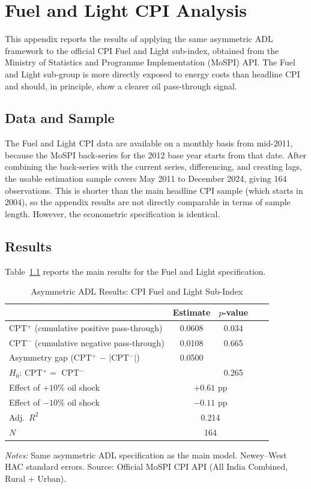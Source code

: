 \chapter{Fuel and Light CPI Analysis}
\label{ch:appendixA}

This appendix reports the results of applying the same asymmetric ADL framework to the official CPI Fuel and Light sub-index, obtained from the Ministry of Statistics and Programme Implementation (MoSPI) API. The Fuel and Light sub-group is more directly exposed to energy costs than headline CPI and should, in principle, show a clearer oil pass-through signal.

\section{Data and Sample}

The Fuel and Light CPI data are available on a monthly basis from mid-2011, because the MoSPI back-series for the 2012 base year starts from that date. After combining the back-series with the current series, differencing, and creating lags, the usable estimation sample covers May 2011 to December 2024, giving 164 observations. This is shorter than the main headline CPI sample (which starts in 2004), so the appendix results are not directly comparable in terms of sample length. However, the econometric specification is identical.

\section{Results}

Table~\ref{tab:fuel_light} reports the main results for the Fuel and Light specification.

\begin{table}[H]
\centering
\caption{Asymmetric ADL Results: CPI Fuel and Light Sub-Index}
\label{tab:fuel_light}
\begin{tabular}{lcccc}
\toprule
& \textbf{Estimate} & \textbf{$p$-value} \\
\midrule
CPT$^+$ (cumulative positive pass-through) & 0.0608 & 0.034 \\
CPT$^-$ (cumulative negative pass-through) & 0.0108 & 0.665 \\
Asymmetry gap (CPT$^+$ $-$ $|$CPT$^-|$) & 0.0500 & \\
$H_0$: CPT$^+ = $ CPT$^-$ & & 0.265 \\
\midrule
Effect of $+10\%$ oil shock & \multicolumn{2}{c}{$+0.61$ pp} \\
Effect of $-10\%$ oil shock & \multicolumn{2}{c}{$-0.11$ pp} \\
Adj.\ $R^2$ & \multicolumn{2}{c}{0.214} \\
$N$ & \multicolumn{2}{c}{164} \\
\bottomrule
\end{tabular}
\begin{flushleft}
\vspace{0.3em}
\small\textit{Notes:} Same asymmetric ADL specification as the main model. Newey--West HAC standard errors. Source: Official MoSPI CPI API (All India Combined, Rural + Urban).
\end{flushleft}
\end{table}

